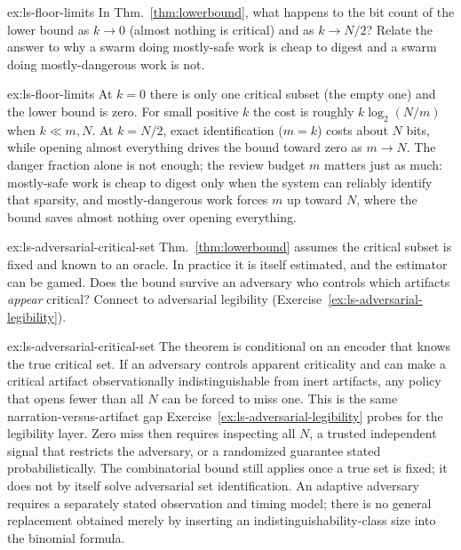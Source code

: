 \documentclass[11pt,a4paper]{article}
\theoremstyle{definition}
\theoremstyle{plain}
\begin{document}
\begin{pdexercise}[kind=Trace,rating=2]{ex:ls-floor-limits}
In Thm.~\ref{thm:lowerbound}, what happens to the bit count of the lower bound as $k\to 0$ (almost
nothing is critical) and as $k\to N/2$? Relate the answer to why a swarm doing
mostly-safe work is cheap to digest and a swarm doing mostly-dangerous work is not.
\end{pdexercise}
\begin{pdsolution}{ex:ls-floor-limits}
At $k=0$ there is only one critical subset (the empty one) and the lower bound is zero. For small positive $k$ the cost is roughly $k\log_2(N/m)$ when $k\ll m,N$. At $k=N/2$, exact identification ($m=k$) costs about $N$ bits, while opening almost everything drives the bound toward zero as $m\to N$. The danger fraction alone is not enough; the review budget $m$ matters just as much: mostly-safe work is cheap to digest only when the system can reliably identify that sparsity, and mostly-dangerous work forces $m$ up toward $N$, where the bound saves almost nothing over opening everything.
\end{pdsolution}
\begin{pdexercise}[kind=Open,rating=3]{ex:ls-adversarial-critical-set}
Thm.~\ref{thm:lowerbound} assumes the critical subset is
fixed and known to an oracle. In practice it is itself estimated, and the estimator
can be gamed. Does the bound survive an adversary who controls which artifacts
\emph{appear} critical? Connect to adversarial legibility (Exercise~\ref{ex:ls-adversarial-legibility}).
\end{pdexercise}
\begin{pdsolution}{ex:ls-adversarial-critical-set}
The theorem is conditional on an encoder that knows the true critical set. If an adversary controls apparent criticality and can make a critical artifact observationally indistinguishable from inert artifacts, any policy that opens fewer than all $N$ can be forced to miss one. This is the same narration-versus-artifact gap Exercise~\ref{ex:ls-adversarial-legibility} probes for the legibility layer. Zero miss then requires inspecting all $N$, a trusted independent signal that restricts the adversary, or a randomized guarantee stated probabilistically. The combinatorial bound still applies once a true set is fixed; it does not by itself solve adversarial set identification. An adaptive adversary requires a separately stated observation and timing model; there is no general replacement obtained merely by inserting an indistinguishability-class size into the binomial formula.
\end{pdsolution}
\end{document}
